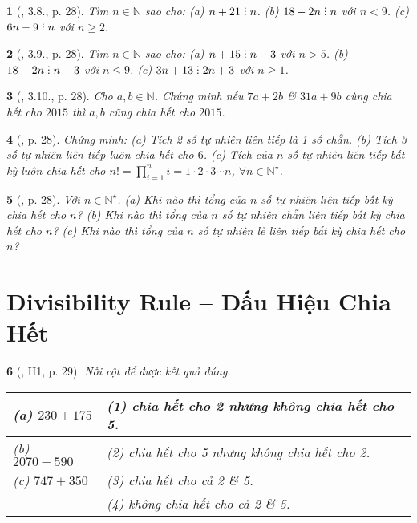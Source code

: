 \documentclass{article}
\newtheorem{baitoan}{}
\DeclareRobustCommand{\divby}{%
	\mathrel{\vbox{\baselineskip.65ex\lineskiplimit0pt\hbox{.}\hbox{.}\hbox{.}}}%
}
\begin{document}
\begin{baitoan}[\cite{Binh_boi_duong_Toan_6_tap_1}, 3.8., p. 28]
	Tìm $n\in\mathbb{N}$ sao cho: (a) $n + 21\divby n$. (b) $18 - 2n\divby n$ với $n < 9$. (c) $6n - 9\divby n$ với $n\ge2$.
\end{baitoan}

\begin{baitoan}[\cite{Binh_boi_duong_Toan_6_tap_1}, 3.9., p. 28]
	Tìm $n\in\mathbb{N}$ sao cho: (a) $n + 15\divby n - 3$ với $n > 5$. (b) $18 - 2n\divby n + 3$ với $n\le9$. (c) $3n + 13\divby2n + 3$ với $n\ge1$.
\end{baitoan}

\begin{baitoan}[\cite{Binh_boi_duong_Toan_6_tap_1}, 3.10., p. 28]
	Cho $a,b\in\mathbb{N}$. Chứng minh nếu $7a + 2b$ \& $31a + 9b$ cùng chia hết cho $2015$ thì $a,b$ cũng chia hết cho $2015$.
\end{baitoan}

\begin{baitoan}[\cite{Binh_boi_duong_Toan_6_tap_1}, p. 28]
	Chứng minh: (a) Tích 2 số tự nhiên liên tiếp là 1 số chẵn. (b) Tích 3 số tự nhiên liên tiếp luôn chia hết cho $6$. (c) Tích của $n$ số tự nhiên liên tiếp bất kỳ luôn chia hết cho $n! = \prod_{i=1}^n i = 1\cdot2\cdot3\cdots n$, $\forall n\in\mathbb{N}^\star$.
\end{baitoan}

\begin{baitoan}[\cite{Binh_boi_duong_Toan_6_tap_1}, p. 28]
	Với $n\in\mathbb{N}^\star$. (a) Khi nào thì tổng của $n$ số tự nhiên liên tiếp bất kỳ chia hết cho $n$? (b) Khi nào thì tổng của $n$ số tự nhiên chẵn liên tiếp bất kỳ chia hết cho $n$? (c) Khi nào thì tổng của $n$ số tự nhiên lẻ liên tiếp bất kỳ chia hết cho $n$?
\end{baitoan}


\section{Divisibility Rule -- Dấu Hiệu Chia Hết}

\begin{baitoan}[\cite{Binh_boi_duong_Toan_6_tap_1}, H1, p. 29]
	Nối cột để được kết quả đúng.
	\begin{table}[H]
		\centering
		\begin{tabular}{|l|l|}
			\hline
			(a) $230 + 175$ & (1) chia hết cho 2 nhưng không chia hết cho 5. \\
			\hline
			(b) $2070 - 590$ & (2) chia hết cho 5 nhưng không chia hết cho 2. \\
			\hline
			(c) $747 + 350$ & (3) chia hết cho cả 2 \& 5. \\
			\hline
			& (4) không chia hết cho cả 2 \& 5. \\
			\hline
		\end{tabular}
	\end{table}
\end{baitoan}
\end{document}
